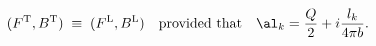 \begin{equation}\label{verl}
(F^{\rm T},B^{\rm T})\;\equiv\; (F^{\rm L},B^{\rm L})
\quad \text{provided that}\quad \al_k=\frac{Q}{2}+i\frac{l_k}{4\pi b}.
\end{equation}

